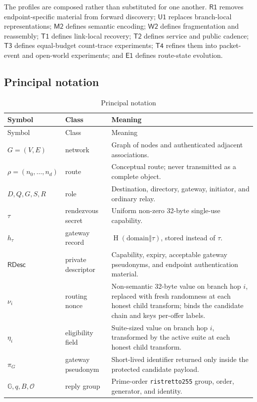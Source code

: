 \documentclass[11pt,oneside]{article}
\newcommand{\concat}{\mathbin\Vert}
\newcommand{\Group}{\mathbb{G}}
\newcommand{\Identity}{\mathcal{O}}
\newcommand{\Hash}{\operatorname{H}}
\newcommand{\Uone}{\ensuremath{\mathsf{U1}}}
\newcommand{\Eone}{\ensuremath{\mathsf{E1}}}
\newcommand{\Rone}{\ensuremath{\mathsf{R1}}}
\newcommand{\Mtwo}{\ensuremath{\mathsf{M2}}}
\newcommand{\Wtwo}{\ensuremath{\mathsf{W2}}}
\newcommand{\Tone}{\ensuremath{\mathsf{T1}}}
\newcommand{\Ttwo}{\ensuremath{\mathsf{T2}}}
\newcommand{\Tthree}{\ensuremath{\mathsf{T3}}}
\newcommand{\Tfour}{\ensuremath{\mathsf{T4}}}
\newcommand{\code}[1]{\texttt{#1}}
\begin{document}
The profiles are composed rather than substituted for one another. \Rone{} removes endpoint-specific material from forward discovery; \Uone{} replaces branch-local representations; \Mtwo{} defines semantic encoding; \Wtwo{} defines fragmentation and reassembly; \Tone{} defines link-local recovery; \Ttwo{} defines service and public cadence; \Tthree{} defines equal-budget count-trace experiments; \Tfour{} refines them into packet-event and open-world experiments; and \Eone{} defines route-state evolution.

\subsection{Principal notation}

\begin{longtable}{@{}p{}p{}p{}@{}}
\caption{Principal notation}\label{tab:notation}\\
\toprule
Symbol & Class & Meaning \\
\midrule
\endfirsthead
\toprule
Symbol & Class & Meaning \\
\midrule
\endhead
$G=(V,E)$ & network & Graph of nodes and authenticated adjacent associations. \\
$\rho=(n_0,\ldots,n_d)$ & route & Conceptual route; never transmitted as a complete object. \\
$D,Q,G,S,R$ & role & Destination, directory, gateway, initiator, and ordinary relay. \\
$\tau$ & rendezvous secret & Uniform non-zero 32-byte single-use capability. \\
$h_\tau$ & gateway record & $\Hash(\text{domain}\concat\tau)$, stored instead of $\tau$. \\
$\mathsf{RDesc}$ & private descriptor & Capability, expiry, acceptable gateway pseudonyms, and endpoint authentication material. \\
$\nu_i$ & routing nonce & Non-semantic 32-byte value on branch hop $i$, replaced with fresh randomness at each honest child transform; binds the candidate chain and keys per-offer labels. \\
$\eta_i$ & eligibility field & Suite-sized value on branch hop $i$, transformed by the active suite at each honest child transform. \\
$\pi_G$ & gateway pseudonym & Short-lived identifier returned only inside the protected candidate payload. \\
$\Group,q,B,\Identity$ & reply group & Prime-order \code{ristretto255} group, order, generator, and identity. \\

\end{longtable}
\end{document}
